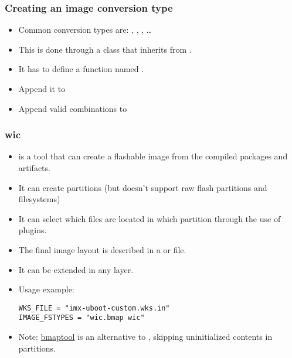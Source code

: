 \begin{frame}
  \frametitle{Creating an image conversion type}
  \begin{itemize}
    \item Common conversion types are: , ,
          , \dots
    \item This is done through a class that inherits from
      .
    \item It has to define a function named .
    \item Append it to 
    \item Append valid combinations to 
  \end{itemize}
\end{frame}

\begin{frame}[fragile]
  \frametitle{wic}
  \begin{itemize}
    \item {} is a tool that can create a flashable image from
      the compiled packages and artifacts.
    \item It can create partitions (but doesn't support raw flash partitions
          and filesystems)
    \item It can select which files are located in
      which partition through the use of plugins.
    \item The final image layout is described in a  or
       file.
    \item It can be extended in any layer.
    \item Usage example:
      \begin{block}{}
        \begin{verbatim}
WKS_FILE = "imx-uboot-custom.wks.in"
IMAGE_FSTYPES = "wic.bmap wic"
        \end{verbatim}
      \end{block}
    \item Note:
      \href{https://docs.yoctoproject.org/dev-manual/bmaptool.html}{bmaptool} is
      an alternative to , skipping uninitialized contents in
      partitions.
  \end{itemize}
\end{frame}


